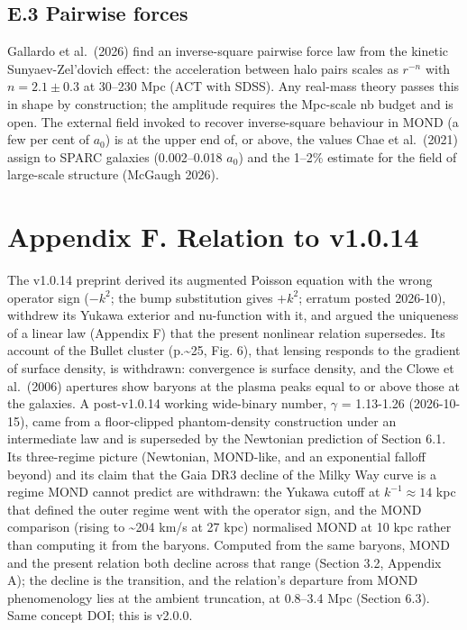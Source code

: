\documentclass[
  10pt,
]{article}
\begin{document}
\subsection{E.3 Pairwise forces}

Gallardo et al.~(2026) find an inverse-square pairwise force law from the kinetic Sunyaev-Zel'dovich effect: the acceleration between halo pairs scales as $r^{-n}$ with $n=2.1\pm0.3$ at 30--230 Mpc (ACT with SDSS). Any real-mass theory passes this
in shape by construction; the amplitude requires the Mpc-scale nb budget
and is open. The external field invoked to recover inverse-square behaviour in MOND (a few per cent of $a_0$) is at the upper end of, or above, the values Chae et al.~(2021) assign to SPARC galaxies (0.002--0.018 $a_0$) and the 1--2\% estimate for the field of large-scale structure (McGaugh 2026).

\section{Appendix F. Relation to v1.0.14}\label{appendix-f.-relation-to-v1.0.14}

The v1.0.14 preprint derived its augmented Poisson equation with the
wrong operator sign ($-k^2$; the bump substitution gives $+k^2$;
erratum posted 2026-10), withdrew its Yukawa exterior and nu-function
with it, and argued the uniqueness of a linear law (Appendix F) that the
present nonlinear relation supersedes. Its account of the Bullet cluster
(p.\textasciitilde{}25, Fig. 6), that lensing responds to the gradient of surface
density, is withdrawn: convergence is surface density, and the Clowe et
al.~(2006) apertures show baryons at the plasma peaks equal to or above
those at the galaxies. A post-v1.0.14 working wide-binary number, $\gamma$
= 1.13-1.26 (2026-10-15), came from a floor-clipped phantom-density
construction under an intermediate law and is superseded by the
Newtonian prediction of Section 6.1. Its three-regime picture (Newtonian, MOND-like, and an exponential falloff beyond) and its claim that the Gaia DR3 decline of the Milky Way curve is a regime MOND cannot predict are withdrawn: the Yukawa cutoff at $k^{-1}\approx14$ kpc that defined the outer regime went with the operator sign, and the MOND comparison (rising to \textasciitilde{}204 km/s at 27 kpc) normalised MOND at 10 kpc rather than computing it from the baryons. Computed from the same baryons, MOND and the present relation both decline across that range (Section 3.2, Appendix A); the decline is the transition, and the relation's departure from MOND phenomenology lies at the ambient truncation, at 0.8--3.4 Mpc (Section 6.3). Same concept DOI; this is v2.0.0.
\end{document}
